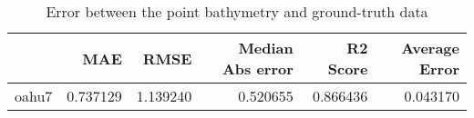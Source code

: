 \begin{table}[h!]
\caption{Error between the point bathymetry and ground-truth data}
\label{tab:oahu7_lidar_error}
\begin{tabular}{lrrrrr}
\toprule
 & MAE & RMSE & Median Abs error & R2 Score & Average Error \\
\midrule
oahu7 & 0.737129 & 1.139240 & 0.520655 & 0.866436 & 0.043170 \\
\bottomrule
\end{tabular}
\end{table}
